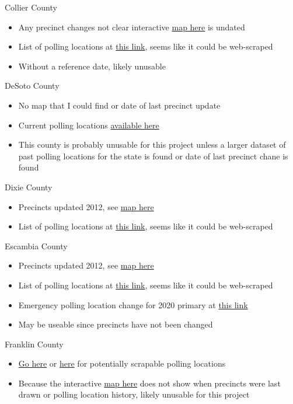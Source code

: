 \documentclass[12pt]{article}
\begin{document}
Collier County
\begin{itemize}
  \item Any precinct changes not clear interactive \href{https://www.colliervotes.com/Voting-System-Maps-Stats/Precinct-Map-Voting-Boundaries}{map here} is undated
  \item List of polling locations at \href{https://www.voterfocus.com/PrecinctFinder/precinctDirectory?county=FL-CLL}{this link},  seems like it could be web-scraped
  \item Without a reference date, likely unusable
\end{itemize}
DeSoto County
\begin{itemize}
  \item No map that I could find or date of last precinct update
  \item Current polling locations \href{https://www.voterfocus.com/PrecinctFinder/precinctDirectory?county=FL-DES}{available here}
  \item This county is probably unusable for this project unless a larger dataset of past polling locations for the state is found or date of last precinct chane is found
\end{itemize}
Dixie County
\begin{itemize}
  \item Precincts updated 2012, see \href{https://www.dixievotes.com/Portals/Dixie/Documents/Maps/Precinct2012.pdf?ver=2014-06-04-143440-740}{map here}
  \item List of polling locations at \href{https://www.voterfocus.com/PrecinctFinder/precinctDirectory?county=FL-DIXs}{this link},  seems like it could be web-scraped
\end{itemize}
Escambia County
\begin{itemize}
  \item Precincts updated 2012, see \href{https://escambiavotes.com/docs/default-source/aws/Precincts_by_District_Combined.pdf}{map here}
  \item List of polling locations at \href{https://www.voterfocus.com/PrecinctFinder/precinctDirectory?county=FL-ESC}{this link},  seems like it could be web-scraped
  \item Emergency polling location change for 2020 primary at \href{https://escambiavotes.com/news/2020/03/11/polling-location-change}{this link}
  \item May be useable since precincts have not been changed
\end{itemize}
Franklin County
\begin{itemize}
  \item \href{https://www.voterfocus.com/PrecinctFinder/precinctDirectory?county=FL-FRA}{Go here} or \href{https://www.votefranklin.com/m/Voter-Information/Polling-Places}{here} for potentially scrapable polling locations
  \item Because the interactive \href{https://www.arcgis.com/apps/webappviewer/index.html?id=02420ce7216f440a9b509e63510bfd9f}{map here} does not show when precincts were last drawn or polling location history, likely unusable for this project
\end{itemize}
\end{document}
